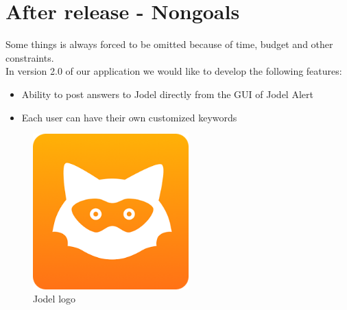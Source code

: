 \documentclass[a4paper,12pt]{article}
\begin{document}
\section{After release - Nongoals}
Some things is always forced to be omitted because of time, budget and other constraints.\\

In version 2.0 of our application we would like to develop the following features:
\begin{itemize}
	\item Ability to post answers to Jodel directly from the GUI of Jodel Alert
	\item Each user can have their own customized keywords
\end{itemize}
\begin{figure}[!h]
	\centering
	\includegraphics[height=6cm]{img/jodel.png}
	\caption{Jodel logo}
	\label{Jodel logo}
\end{figure}
\end{document}
